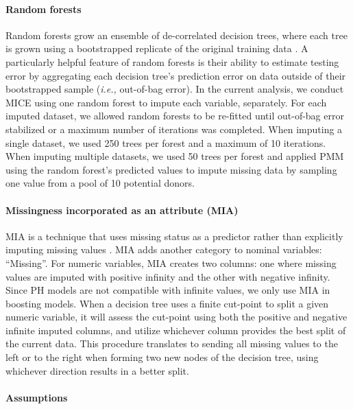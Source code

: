 \documentclass{article}
\begin{document}
\paragraph{Random forests}

Random forests grow an ensemble of de-correlated decision trees, where
each tree is grown using a bootstrapped replicate of the original
training data
\cite{Breiman2001, hothorn2006survival, strobl2007bias, strobl2008conditional, ishwaran2008random, jaeger2019oblique}.
A particularly helpful feature of random forests is their ability to
estimate testing error by aggregating each decision tree's prediction
error on data outside of their bootstrapped sample
(\textit{i.e., }out-of-bag error). In the current analysis, we conduct
MICE using one random forest to impute each variable, separately. For
each imputed dataset, we allowed random forests to be re-fitted until
out-of-bag error stabilized or a maximum number of iterations was
completed. When imputing a single dataset, we used 250 trees per forest
and a maximum of 10 iterations. When imputing multiple datasets, we used
50 trees per forest and applied PMM using the random forest's predicted
values to impute missing data by sampling one value from a pool of 10
potential donors.

\paragraph{Missingness incorporated as an attribute (MIA)}

MIA is a technique that uses missing status as a predictor rather than
explicitly imputing missing values
\cite{twala2009empirical, ding2010investigation}. MIA adds another
category to nominal variables: ``Missing''. For numeric variables, MIA
creates two columns: one where missing values are imputed with positive
infinity and the other with negative infinity. Since PH models are not
compatible with infinite values, we only use MIA in boosting models.
When a decision tree uses a finite cut-point to split a given numeric
variable, it will assess the cut-point using both the positive and
negative infinite imputed columns, and utilize whichever column provides
the best split of the current data. This procedure translates to sending
all missing values to the left or to the right when forming two new
nodes of the decision tree, using whichever direction results in a
better split.

\paragraph{Assumptions}
\end{document}
